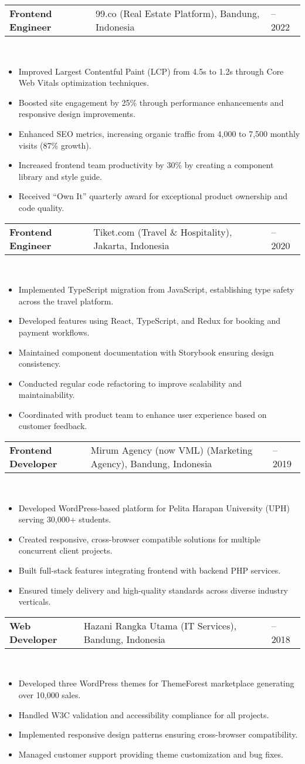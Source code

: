 \documentclass[a4paper, 11pt]{article}
\newcommand{\resumeItem}[1]{
  \item\small{
    {#1 \vspace{-2pt}}
  }
}
\newcommand{\resumeSubheading}[4]{
  \vspace{-2pt}\item
    \begin{tabularx}{0.987\textwidth}[t]{
  >{\raggedright\arraybackslash}X
  >{\centering\arraybackslash}X
  >{\raggedleft\arraybackslash}X }
      \textbf{#1} & #2 & #3 \\
    \end{tabularx}
    \textit{\small#4}\\
    \vspace{-7pt}
}
\newcommand{\resumeItemListStart}{\begin{itemize}[leftmargin=0.22in]}
\newcommand{\resumeItemListEnd}{\end{itemize}\vspace{-20pt}}
\begin{document}
        \resumeSubheading
            {Frontend Engineer}{99.co (Real Estate Platform), Bandung, Indonesia}{2020 -- 2022}{}
            \resumeItemListStart
                \resumeItem{Improved Largest Contentful Paint (LCP) from 4.5s to 1.2s through Core Web Vitals optimization techniques.}
                \resumeItem{Boosted site engagement by 25\% through performance enhancements and responsive design improvements.}
                \resumeItem{Enhanced SEO metrics, increasing organic traffic from 4,000 to 7,500 monthly visits (87\% growth).}
                \resumeItem{Increased frontend team productivity by 30\% by creating a component library and style guide.}
                \resumeItem{Received ``Own It'' quarterly award for exceptional product ownership and code quality.}
            \resumeItemListEnd

        \resumeSubheading
            {Frontend Engineer}{Tiket.com (Travel \& Hospitality), Jakarta, Indonesia}{2019 -- 2020}{}
            \resumeItemListStart
                \resumeItem{Implemented TypeScript migration from JavaScript, establishing type safety across the travel platform.}
                \resumeItem{Developed features using React, TypeScript, and Redux for booking and payment workflows.}
                \resumeItem{Maintained component documentation with Storybook ensuring design consistency.}
                \resumeItem{Conducted regular code refactoring to improve scalability and maintainability.}
                \resumeItem{Coordinated with product team to enhance user experience based on customer feedback.}
            \resumeItemListEnd

        \resumeSubheading
            {Frontend Developer}{Mirum Agency (now VML) (Marketing Agency), Bandung, Indonesia}{2018 -- 2019}{}
            \resumeItemListStart
                \resumeItem{Developed WordPress-based platform for Pelita Harapan University (UPH) serving 30,000+ students.}
                \resumeItem{Created responsive, cross-browser compatible solutions for multiple concurrent client projects.}
                \resumeItem{Built full-stack features integrating frontend with backend PHP services.}
                \resumeItem{Ensured timely delivery and high-quality standards across diverse industry verticals.}
            \resumeItemListEnd

        \resumeSubheading
            {Web Developer}{Hazani Rangka Utama (IT Services), Bandung, Indonesia}{2017 -- 2018}{}
            \resumeItemListStart
                \resumeItem{Developed three WordPress themes for ThemeForest marketplace generating over 10,000 sales.}
                \resumeItem{Handled W3C validation and accessibility compliance for all projects.}
                \resumeItem{Implemented responsive design patterns ensuring cross-browser compatibility.}
                \resumeItem{Managed customer support providing theme customization and bug fixes.}
            \resumeItemListEnd
\end{document}
